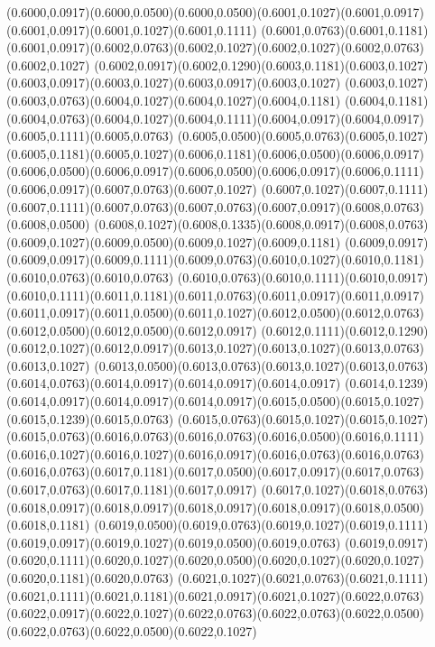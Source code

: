 (0.6000,0.0917)(0.6000,0.0500)(0.6000,0.0500)(0.6001,0.1027)(0.6001,0.0917)(0.6001,0.0917)(0.6001,0.1027)(0.6001,0.1111)
(0.6001,0.0763)(0.6001,0.1181)(0.6001,0.0917)(0.6002,0.0763)(0.6002,0.1027)(0.6002,0.1027)(0.6002,0.0763)(0.6002,0.1027)
(0.6002,0.0917)(0.6002,0.1290)(0.6003,0.1181)(0.6003,0.1027)(0.6003,0.0917)(0.6003,0.1027)(0.6003,0.0917)(0.6003,0.1027)
(0.6003,0.1027)(0.6003,0.0763)(0.6004,0.1027)(0.6004,0.1027)(0.6004,0.1181)
\PST@Solid(0.6004,0.1181)(0.6004,0.0763)(0.6004,0.1027)(0.6004,0.1111)(0.6004,0.0917)(0.6004,0.0917)(0.6005,0.1111)(0.6005,0.0763)
(0.6005,0.0500)(0.6005,0.0763)(0.6005,0.1027)(0.6005,0.1181)(0.6005,0.1027)(0.6006,0.1181)(0.6006,0.0500)(0.6006,0.0917)
(0.6006,0.0500)(0.6006,0.0917)(0.6006,0.0500)(0.6006,0.0917)(0.6006,0.1111)(0.6006,0.0917)(0.6007,0.0763)(0.6007,0.1027)
(0.6007,0.1027)(0.6007,0.1111)(0.6007,0.1111)(0.6007,0.0763)(0.6007,0.0763)(0.6007,0.0917)(0.6008,0.0763)(0.6008,0.0500)
(0.6008,0.1027)(0.6008,0.1335)(0.6008,0.0917)(0.6008,0.0763)(0.6009,0.1027)(0.6009,0.0500)(0.6009,0.1027)(0.6009,0.1181)
(0.6009,0.0917)(0.6009,0.0917)(0.6009,0.1111)(0.6009,0.0763)(0.6010,0.1027)(0.6010,0.1181)(0.6010,0.0763)(0.6010,0.0763)
(0.6010,0.0763)(0.6010,0.1111)(0.6010,0.0917)(0.6010,0.1111)(0.6011,0.1181)(0.6011,0.0763)(0.6011,0.0917)(0.6011,0.0917)
(0.6011,0.0917)(0.6011,0.0500)(0.6011,0.1027)(0.6012,0.0500)(0.6012,0.0763)(0.6012,0.0500)(0.6012,0.0500)(0.6012,0.0917)
(0.6012,0.1111)(0.6012,0.1290)(0.6012,0.1027)(0.6012,0.0917)(0.6013,0.1027)(0.6013,0.1027)(0.6013,0.0763)(0.6013,0.1027)
(0.6013,0.0500)(0.6013,0.0763)(0.6013,0.1027)(0.6013,0.0763)(0.6014,0.0763)(0.6014,0.0917)(0.6014,0.0917)(0.6014,0.0917)
(0.6014,0.1239)(0.6014,0.0917)(0.6014,0.0917)(0.6014,0.0917)(0.6015,0.0500)(0.6015,0.1027)(0.6015,0.1239)(0.6015,0.0763)
(0.6015,0.0763)(0.6015,0.1027)(0.6015,0.1027)(0.6015,0.0763)(0.6016,0.0763)(0.6016,0.0763)(0.6016,0.0500)(0.6016,0.1111)
(0.6016,0.1027)(0.6016,0.1027)(0.6016,0.0917)(0.6016,0.0763)(0.6016,0.0763)
\PST@Solid(0.6016,0.0763)(0.6017,0.1181)(0.6017,0.0500)(0.6017,0.0917)(0.6017,0.0763)(0.6017,0.0763)(0.6017,0.1181)(0.6017,0.0917)
(0.6017,0.1027)(0.6018,0.0763)(0.6018,0.0917)(0.6018,0.0917)(0.6018,0.0917)(0.6018,0.0917)(0.6018,0.0500)(0.6018,0.1181)
(0.6019,0.0500)(0.6019,0.0763)(0.6019,0.1027)(0.6019,0.1111)(0.6019,0.0917)(0.6019,0.1027)(0.6019,0.0500)(0.6019,0.0763)
(0.6019,0.0917)(0.6020,0.1111)(0.6020,0.1027)(0.6020,0.0500)(0.6020,0.1027)(0.6020,0.1027)(0.6020,0.1181)(0.6020,0.0763)
(0.6021,0.1027)(0.6021,0.0763)(0.6021,0.1111)(0.6021,0.1111)(0.6021,0.1181)(0.6021,0.0917)(0.6021,0.1027)(0.6022,0.0763)
(0.6022,0.0917)(0.6022,0.1027)(0.6022,0.0763)(0.6022,0.0763)(0.6022,0.0500)(0.6022,0.0763)(0.6022,0.0500)(0.6022,0.1027)
